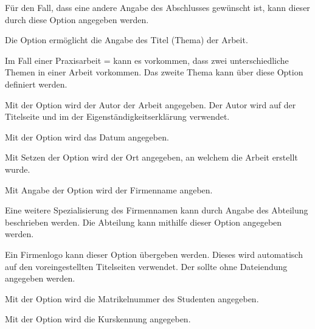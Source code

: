 \documentclass[babel=ngerman,highlight=false]{skdoc}
\begin{document}
                Für den Fall, dass eine andere Angabe des Abschlusses gewünscht ist, kann dieser durch diese Option angegeben werden.\medskip
    
                Die Option ermöglicht die Angabe des Titel (Thema) der Arbeit.\medskip
    
                Im Fall einer Praxisarbeit  =  kann es vorkommen, dass zwei unterschiedliche Themen in einer Arbeit vorkommen. Das zweite Thema kann über diese Option definiert werden.\medskip
    
                Mit der Option wird der Autor der Arbeit angegeben. Der Autor wird auf der Titelseite und im der Eigenständigkeitserklärung verwendet.\medskip
    
                Mit der Option wird das Datum angegeben.\medskip
    
                Mit Setzen der Option wird der Ort angegeben, an welchem die Arbeit erstellt wurde.\medskip
    
                Mit Angabe der Option wird der Firmenname angeben.\medskip
    
                Eine weitere Spezialisierung des Firmennamen kann durch Angabe des Abteilung beschrieben werden. Die Abteilung kann mithilfe dieser Option angegeben werden.\medskip
    
                Ein Firmenlogo kann dieser Option übergeben werden. Dieses wird automatisch auf den voreingestellten Titelseiten verwendet. Der  sollte ohne Dateiendung angegeben werden.\medskip
    
                Mit der Option wird die Matrikelnummer des Studenten angegeben.\medskip
    
                Mit der Option wird die Kurskennung angegeben.\medskip
    
\end{document}
